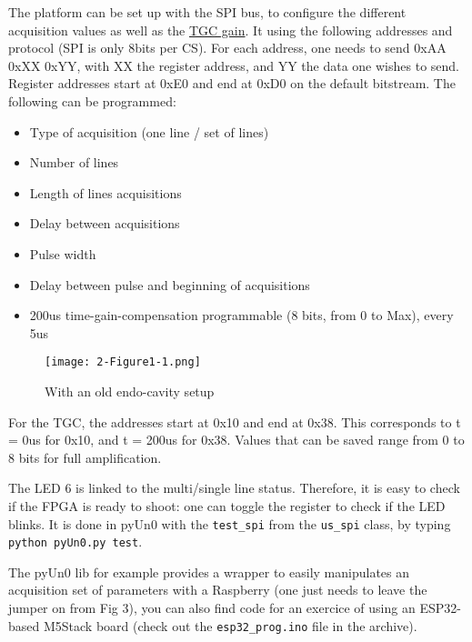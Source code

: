 \documentclass{article}
\begin{document}
The platform can be set up with the SPI bus, to configure the different acquisition values as well as the \href{https://github.com/kelu124/echomods/blob/master/include/experiments/auto/20180721a.md}{TGC gain}. It using the following addresses and protocol (SPI is only 8bits per CS). For each address, one needs to send 0xAA 0xXX 0xYY, with XX the register address, and YY the data one wishes to send. Register addresses start at 0xE0 and end at 0xD0 on the default bitstream. The following can be programmed:

\begin{itemize}
\item Type of acquisition (one line / set of lines)
\item Number of lines
\item Length of lines acquisitions
\item Delay between acquisitions
\item Pulse width
\item Delay between pulse and beginning of acquisitions
\item 200us time-gain-compensation programmable (8 bits, from 0 to Max), every 5us
\end{itemize}
 
 
\begin{wrapfigure}{l}{0.19\textwidth}
  \vspace{-15pt}
  \begin{center}
    \texttt{[image: 2-Figure1-1.png]}
  \end{center}
    \vspace{-13pt}
  \caption{With an old endo-cavity setup}
  \vspace{-25pt}
\end{wrapfigure}

For the TGC, the addresses start at 0x10 and end at 0x38. This corresponds to t = 0us for 0x10, and t = 200us for 0x38. Values that can be saved range from 0 to 8 bits for full amplification.

The LED 6 is linked to the multi/single line status. Therefore, it is easy to check if the FPGA is ready to shoot: one can toggle the register to check if the LED blinks. It is done in pyUn0 with the \verb|test_spi| from the \verb|us_spi| class, by typing \verb|python pyUn0.py test|.

The pyUn0 lib for example provides a wrapper to easily manipulates an acquisition set of parameters with a Raspberry (one just needs to leave the jumper on from Fig 3), you can also find code for an exercice of using an ESP32-based M5Stack board (check out the \verb|esp32_prog.ino| file in the archive).
\end{document}
